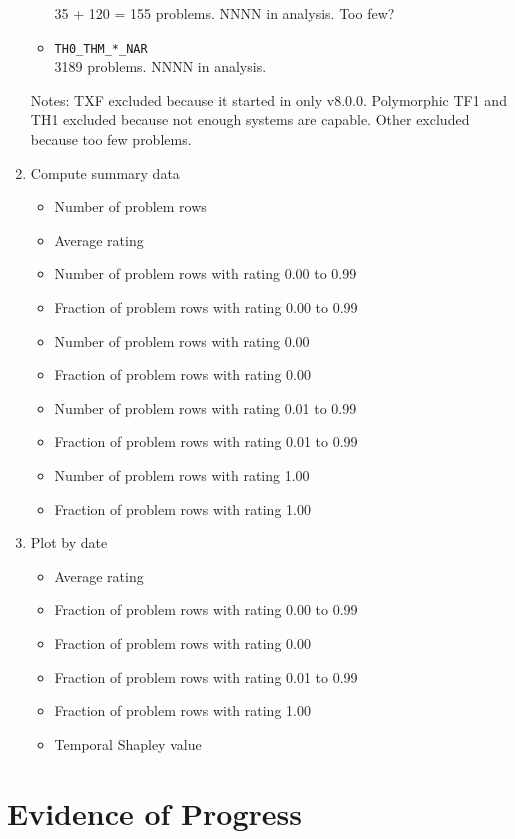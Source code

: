 \documentclass[runningheads]{llncs}
\begin{document}
\begin{enumerate}
\begin{itemize}
            35 + 120 = 155 problems. NNNN in analysis.
            Too few?
      \item {\tt TH0\_THM\_*\_NAR} \\
            3189 problems. NNNN in analysis.
      \end{itemize}
      Notes: TXF excluded because it started in only v8.0.0.
      Polymorphic TF1 and TH1 excluded because not enough systems are capable.
      Other excluded because too few problems.
\item Compute summary data
      \begin{itemize}
      \item Number of problem rows
      \item Average rating
      \item Number of problem rows with rating 0.00 to 0.99
      \item Fraction of problem rows with rating 0.00 to 0.99
      \item Number of problem rows with rating 0.00
      \item Fraction of problem rows with rating 0.00
      \item Number of problem rows with rating 0.01 to 0.99
      \item Fraction of problem rows with rating 0.01 to 0.99
      \item Number of problem rows with rating 1.00
      \item Fraction of problem rows with rating 1.00
      \end{itemize}
\item Plot by date
      \begin{itemize}
      \item Average rating
      \item Fraction of problem rows with rating 0.00 to 0.99
      \item Fraction of problem rows with rating 0.00
      \item Fraction of problem rows with rating 0.01 to 0.99
      \item Fraction of problem rows with rating 1.00
      \item Temporal Shapley value
      \end{itemize}
\end{enumerate}

\section{Evidence of Progress}
\label{Evidence}
\end{document}
